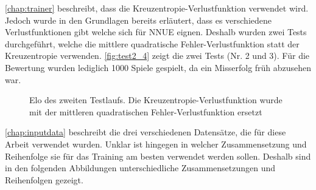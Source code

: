 
\autoref{chap:trainer} beschreibt, dass die Kreuzentropie-Verlustfunktion verwendet wird. Jedoch wurde in den Grundlagen bereits erläutert, dass es verschiedene Verlustfunktionen gibt welche sich für \ac{NNUE} eignen. Deshalb wurden zwei Tests durchgeführt, welche die mittlere quadratische Fehler-Verlustfunktion statt der Kreuzentropie verwenden. \autoref{fig:test2_4} zeigt die zwei Tests (Nr. 2 und 3). Für die Bewertung wurden lediglich 1000 Spiele gespielt, da ein Misserfolg früh abzusehen war.

\begin{figure}
  \centering
  \caption{Elo des zweiten Testlaufs. Die Kreuzentropie-Verlustfunktion wurde mit der mittleren quadratischen Fehler-Verlustfunktion ersetzt}
  \label{fig:test2_4}
\end{figure}

\autoref{chap:inputdata} beschreibt die drei verschiedenen Datensätze, die für diese Arbeit verwendet wurden. Unklar ist hingegen in welcher Zusammensetzung und Reihenfolge sie für das Training am besten verwendet werden sollen. Deshalb sind in den folgenden Abbildungen unterschiedliche Zusammensetzungen und Reihenfolgen gezeigt.

